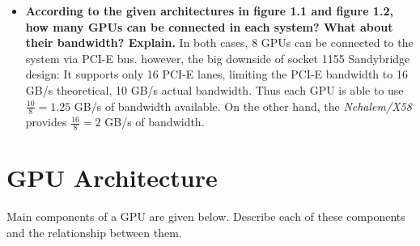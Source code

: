 \documentclass[12pt]{article}
\numberwithin{equation}{section}
\numberwithin{table}{section}
\numberwithin{figure}{section}
\begin{document}
\begin{itemize}
	\item \textbf{According to the given architectures in figure 1.1 and figure 1.2, how many GPUs can be connected in each system? What about their bandwidth? Explain.
	}
	In both cases, 8 GPUs can be connected to the system via PCI-E bus. however, the big downside of socket 1155 Sandybridge design: It supports only 16 PCI-E
	lanes, limiting the PCI-E bandwidth to 16 GB/s theoretical, 10 GB/s actual bandwidth. Thus each GPU is able to use $\frac{10}{8} = 1.25$ GB/s of bandwidth available. On the other hand, the \textit{Nehalem/X58} provides $\frac{16}{8} = 2$ GB/s of bandwidth.
\end{itemize}

\section{GPU Architecture}
Main components of a GPU are given below. Describe each of these components and the relationship between them.
\end{document}
